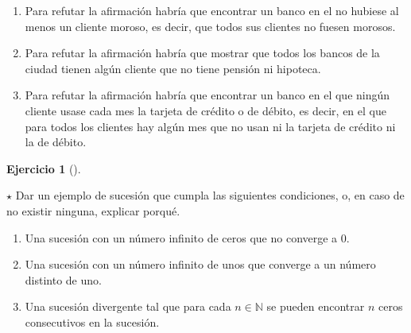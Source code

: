 \documentclass[
  spanish,
  a4paper,
]{scrreport}
\providecommand{\tightlist}{%
  \setlength{\itemsep}{0pt}\setlength{\parskip}{0pt}}
\theoremstyle{definition}
\newtheorem{exercise}{Ejercicio}[chapter]
\theoremstyle{remark}
\begin{document}
\begin{tcolorbox}[enhanced jigsaw, arc=.35mm, bottomrule=.15mm, bottomtitle=1mm, breakable, colback=white, colbacktitle=quarto-callout-tip-color!10!white, colframe=quarto-callout-tip-color-frame, coltitle=black, left=2mm, leftrule=.75mm, opacityback=0, opacitybacktitle=0.6, rightrule=.15mm, title=\textcolor{quarto-callout-tip-color}{\faLightbulb}\hspace{0.5em}{Solución}, titlerule=0mm, toprule=.15mm, toptitle=1mm]

\begin{enumerate}
\def\labelenumi{\alph{enumi}.}
\tightlist
\item
  Para refutar la afirmación habría que encontrar un banco en el no
  hubiese al menos un cliente moroso, es decir, que todos sus clientes
  no fuesen morosos.
\item
  Para refutar la afirmación habría que mostrar que todos los bancos de
  la ciudad tienen algún cliente que no tiene pensión ni hipoteca.
\item
  Para refutar la afirmación habría que encontrar un banco en el que
  ningún cliente usase cada mes la tarjeta de crédito o de débito, es
  decir, en el que para todos los clientes hay algún mes que no usan ni
  la tarjeta de crédito ni la de débito.
\end{enumerate}

\end{tcolorbox}

\begin{exercise}[]\protect\hypertarget{exr-ejemplo-sucesiones-1}{}\label{exr-ejemplo-sucesiones-1}

\(\star\) Dar un ejemplo de sucesión que cumpla las siguientes
condiciones, o, en caso de no existir ninguna, explicar porqué.

\begin{enumerate}
\def\labelenumi{\alph{enumi}.}
\tightlist
\item
  Una sucesión con un número infinito de ceros que no converge a 0.
\item
  Una sucesión con un número infinito de unos que converge a un número
  distinto de uno.
\item
  Una sucesión divergente tal que para cada \(n\in\mathbb{N}\) se pueden
  encontrar \(n\) ceros consecutivos en la sucesión.
\end{enumerate}

\end{exercise}
\end{document}
